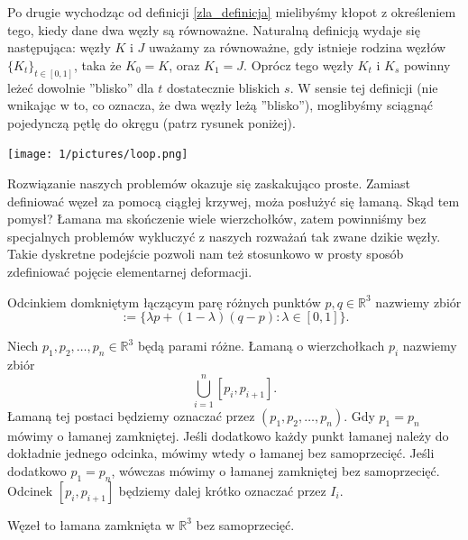 Po drugie wychodząc od definicji \ref{zla_definicja} mielibyśmy kłopot z określeniem tego, kiedy dane dwa węzły są równoważne. Naturalną definicją wydaje się
następująca: węzły $K$ i $J$ uważamy za równoważne, gdy istnieje rodzina węzłów $\lbrace K_t\rbrace_{t\in[0,1]}$, taka że $K_0 = K$, oraz $K_1 = J$. Oprócz tego 
węzły $K_t$ i $K_s$ powinny leżeć dowolnie ''blisko'' dla $t$ dostatecznie bliskich $s$. W sensie tej definicji (nie wnikając w to, co oznacza,
że dwa węzły leżą ''blisko''), moglibyśmy sciągnąć pojedynczą pętlę do okręgu (patrz rysunek poniżej). 


	\begin{center}
	
	\texttt{[image: 1/pictures/loop.png]} 
	\end{center}


Rozwiązanie naszych problemów okazuje się zaskakująco proste. Zamiast definiować węzeł za pomocą ciągłej krzywej, moża posłużyć się łamaną. Skąd tem pomysł? Łamana ma skończenie wiele
wierzchołków, zatem powinniśmy bez specjalnych problemów wykluczyć z naszych rozważań tak zwane dzikie węzły. Takie dyskretne podejście pozwoli nam też stosunkowo w prosty sposób zdefiniować
pojęcie elementarnej deformacji.



\begin{definicja}
 Odcinkiem domkniętym łączącym parę różnych punktów $p,q\in\mathbb{R}^3$ nazwiemy zbiór 
 \begin{displaymath}
  [p,q] := \lbrace \lambda p + (1-\lambda)(q-p): \lambda\in[0,1]\rbrace.
 \end{displaymath}
\end{definicja}

\begin{definicja}
 Niech $p_1, p_2, \ldots, p_n\in\mathbb{R}^3$ będą parami różne. Łamaną o wierzchołkach $p_i$ nazwiemy zbiór 
 \begin{displaymath}
  \bigcup_{i=1}^n [p_i, p_{i+1}].
 \end{displaymath}
 Łamaną tej postaci będziemy oznaczać przez $(p_1, p_2, \ldots, p_n)$. Gdy $p_1 = p_n$ mówimy o łamanej zamkniętej.
 Jeśli dodatkowo każdy punkt łamanej należy do dokładnie jednego odcinka, mówimy wtedy o łamanej bez samoprzecięć. Jeśli dodatkowo $p_1 = p_n$, wówczas mówimy o łamanej
 zamkniętej bez samoprzecięć. Odcinek $[p_i, p_{i+1}]$ będziemy dalej krótko oznaczać przez $I_i$.
\end{definicja}

\begin{definicja}
 Węzeł to łamana zamknięta w $\mathbb{R}^3$ bez samoprzecięć.
\end{definicja}

